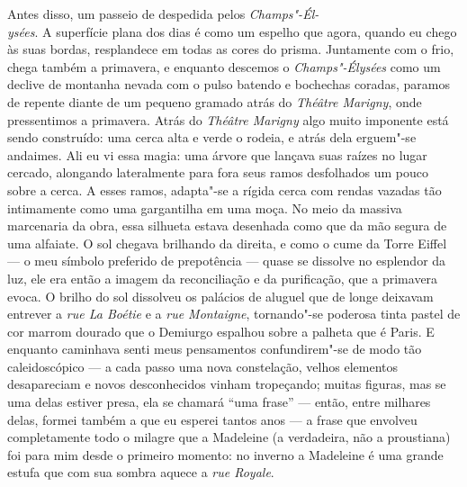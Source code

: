 Antes disso, um passeio de despedida pelos \emph{Champs"-Él-\\ysées}. A superfície
plana dos dias é como um espelho que agora, quando eu chego às suas
bordas, resplandece em todas as cores do prisma. Juntamente com o frio,
chega também a primavera, e enquanto descemos o \emph{Champs"-Élysées} como um
declive de montanha nevada com o pulso batendo e bochechas coradas,
paramos de repente diante de um pequeno gramado atrás do \emph{Théâtre
Marigny}, onde pressentimos a primavera. Atrás do \emph{Théâtre Marigny} algo
muito imponente está sendo construído: uma cerca alta e verde o rodeia,
e atrás dela erguem"-se andaimes. Ali eu vi essa magia: uma árvore que
lançava suas raízes no lugar cercado, alongando lateralmente para fora
seus ramos desfolhados um pouco sobre a cerca. A esses ramos, adapta"-se a
rígida cerca com rendas vazadas tão intimamente como uma gargantilha em
uma moça. No meio da massiva marcenaria da obra, essa silhueta estava
desenhada como que da mão segura de uma alfaiate. O sol chegava
brilhando da direita, e como o cume da Torre Eiffel --- o meu símbolo
preferido de prepotência --- quase se dissolve no esplendor da luz, ele
era então a imagem da reconciliação e da purificação, que a primavera
evoca. O brilho do sol dissolveu os palácios de aluguel que de longe
deixavam entrever a \emph{rue La Boétie} e a \emph{rue Montaigne},
tornando"-se poderosa tinta pastel de cor marrom dourado que o Demiurgo
espalhou sobre a palheta que é Paris. E enquanto caminhava senti meus
pensamentos confundirem"-se de modo tão caleidoscópico --- a cada passo
uma nova constelação, velhos elementos desapareciam e novos
desconhecidos vinham tropeçando; muitas figuras, mas se uma delas
estiver presa, ela se chamará ``uma frase'' --- então, entre milhares
delas, formei também a que eu esperei tantos anos --- a frase que
envolveu completamente todo o milagre que a Madeleine (a verdadeira, não
a proustiana) foi para mim desde o primeiro momento: no inverno a
Madeleine é uma grande estufa que com sua sombra aquece a \emph{rue
Royale}.
